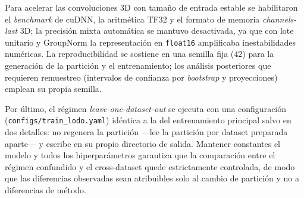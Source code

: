 Para acelerar las convoluciones 3D con tamaño de entrada estable se habilitaron
el \emph{benchmark} de cuDNN, la aritmética TF32 y el formato de memoria
\emph{channels-last} 3D; la precisión mixta automática se mantuvo desactivada,
ya que con lote unitario y GroupNorm la representación en \texttt{float16}
amplificaba inestabilidades numéricas. La reproducibilidad se sostiene en una
semilla fija ($42$) para la generación de la partición y el entrenamiento; los
análisis posteriores que requieren remuestreo (intervalos de confianza por
\emph{bootstrap} y proyecciones) emplean su propia semilla.

Por último, el régimen \emph{leave-one-dataset-out} se ejecuta con una
configuración (\texttt{configs/train\_lodo.yaml}) idéntica a la del entrenamiento
principal salvo en dos detalles: no regenera la partición ---lee la partición por
dataset preparada aparte--- y escribe en su propio directorio de salida. Mantener
constantes el modelo y todos los hiperparámetros garantiza que la comparación
entre el régimen confundido y el cross-dataset quede estrictamente controlada,
de modo que las diferencias observadas sean atribuibles solo al cambio de
partición y no a diferencias de método.

